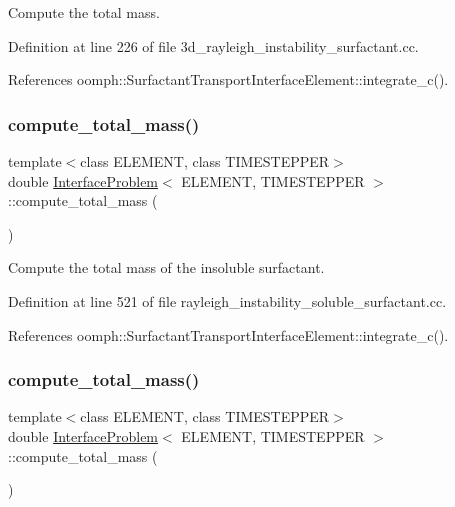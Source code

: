 Compute the total mass. 



Definition at line 226 of file 3d\+\_\+rayleigh\+\_\+instability\+\_\+surfactant.\+cc.



References oomph\+::\+Surfactant\+Transport\+Interface\+Element\+::integrate\+\_\+c().

\mbox{\label{classInterfaceProblem_a9b19bc90667fe8c7885d8ee113812e27}} 
\subsubsection{\texorpdfstring{compute\+\_\+total\+\_\+mass()}{compute\_total\_mass()}\hspace{0.1cm}{\footnotesize\ttfamily [2/3]}}
{\footnotesize\ttfamily template$<$class E\+L\+E\+M\+E\+NT, class T\+I\+M\+E\+S\+T\+E\+P\+P\+ER$>$ \\
double \hyperlink{classInterfaceProblem}{Interface\+Problem}$<$ E\+L\+E\+M\+E\+NT, T\+I\+M\+E\+S\+T\+E\+P\+P\+ER $>$\+::compute\+\_\+total\+\_\+mass (\begin{DoxyParamCaption}{ }\end{DoxyParamCaption})\hspace{0.3cm}{\ttfamily [inline]}}



Compute the total mass of the insoluble surfactant. 



Definition at line 521 of file rayleigh\+\_\+instability\+\_\+soluble\+\_\+surfactant.\+cc.



References oomph\+::\+Surfactant\+Transport\+Interface\+Element\+::integrate\+\_\+c().

\mbox{\label{classInterfaceProblem_a9b19bc90667fe8c7885d8ee113812e27}} 
\subsubsection{\texorpdfstring{compute\+\_\+total\+\_\+mass()}{compute\_total\_mass()}\hspace{0.1cm}{\footnotesize\ttfamily [3/3]}}
{\footnotesize\ttfamily template$<$class E\+L\+E\+M\+E\+NT, class T\+I\+M\+E\+S\+T\+E\+P\+P\+ER$>$ \\
double \hyperlink{classInterfaceProblem}{Interface\+Problem}$<$ E\+L\+E\+M\+E\+NT, T\+I\+M\+E\+S\+T\+E\+P\+P\+ER $>$\+::compute\+\_\+total\+\_\+mass (\begin{DoxyParamCaption}{ }\end{DoxyParamCaption})\hspace{0.3cm}{\ttfamily [inline]}}



